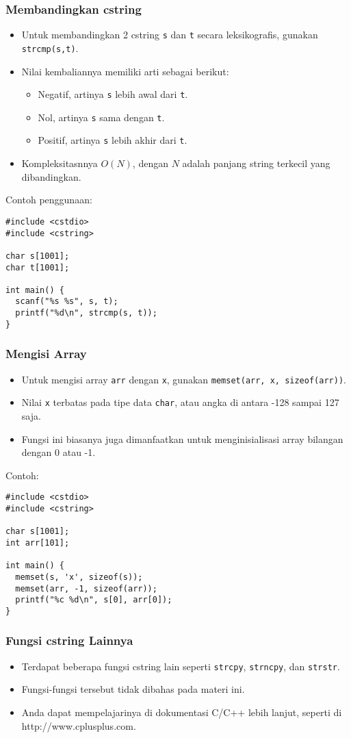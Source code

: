 \begin{frame}[fragile]
\frametitle{Membandingkan cstring}
\begin{itemize}
  \item Untuk membandingkan 2 cstring \texttt{s} dan \texttt{t} secara leksikografis, gunakan \texttt{strcmp(s,t)}.
  \item Nilai kembaliannya memiliki arti sebagai berikut:
  \begin{itemize}
    \item Negatif, artinya \texttt{s} lebih awal dari \texttt{t}.
    \item Nol, artinya \texttt{s} sama dengan \texttt{t}.
    \item Positif, artinya \texttt{s} lebih akhir dari \texttt{t}.
  \end{itemize}
  \item Kompleksitasnnya $O(N)$, dengan $N$ adalah panjang string terkecil yang dibandingkan.
\end{itemize}
Contoh penggunaan:
\begin{lstlisting}
#include <cstdio>
#include <cstring>

char s[1001];
char t[1001];

int main() {
  scanf("%s %s", s, t);
  printf("%d\n", strcmp(s, t));
}
\end{lstlisting}
\end{frame}


\begin{frame}[fragile]
\frametitle{Mengisi Array}
\begin{itemize}
  \item Untuk mengisi array \texttt{arr} dengan \texttt{x}, gunakan \texttt{memset(arr, x, sizeof(arr))}.
  \item Nilai \texttt{x} terbatas pada tipe data \texttt{char}, atau angka di antara -128 sampai 127 saja.
  \item Fungsi ini biasanya juga dimanfaatkan untuk menginisialisasi array bilangan dengan 0 atau -1.
\end{itemize}
Contoh:
\begin{lstlisting}
#include <cstdio>
#include <cstring>

char s[1001];
int arr[101];

int main() {
  memset(s, 'x', sizeof(s));
  memset(arr, -1, sizeof(arr));
  printf("%c %d\n", s[0], arr[0]);
}
\end{lstlisting}
\end{frame}

\begin{frame}[fragile]
\frametitle{Fungsi cstring Lainnya}
\begin{itemize}
  \item Terdapat beberapa fungsi cstring lain seperti \texttt{strcpy}, \texttt{strncpy}, dan \texttt{strstr}.
  \item Fungsi-fungsi tersebut tidak dibahas pada materi ini.
  \item Anda dapat mempelajarinya di dokumentasi C/C++ lebih lanjut, seperti di http://www.cplusplus.com.
\end{itemize}
\end{frame}

